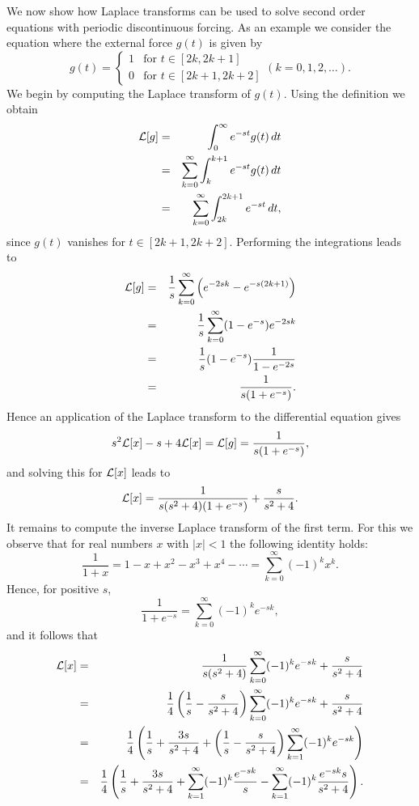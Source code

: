\documentclass{ximera}
\begin{document}
We now show how Laplace transforms can be used to solve second order
equations with periodic discontinuous forcing.  As an example we consider
the equation  where the external force $g(t)$ is
given by
\begin{equation}
g(t) =  
\left\{\begin{array}{cl} 1 & \mbox{for $t \in [2k,2k+1]$} \\ 
		0 & \mbox{for $t \in [2k+1,2k+2]$} \end{array} \right.
(k=0,1,2,\ldots).
\end{equation}
We begin by computing the Laplace transform of $g(t)$. Using the 
definition we obtain
\begin{eqnarray*}
{\cal L}[g] & = & \int_0^\infty e^{-st} g(t)\, dt\\
&=& \sum_{k=0}^\infty \int_k^{k+1} e^{-st} g(t)\, dt\\
&=& \sum_{k=0}^\infty \int_{2k}^{2k+1} e^{-st}\, dt,
\end{eqnarray*}
since $g(t)$ vanishes for $t \in [2k+1,2k+2]$. Performing the
integrations leads to
\begin{eqnarray*}
{\cal L}[g] & = & \frac{1}{s}\sum_{k=0}^\infty \left(e^{-2sk}-e^{-s(2k+1)}\right)\\
&=& \frac{1}{s}\sum_{k=0}^\infty (1-e^{-s})e^{-2sk}\\
&=& \frac{1}{s} (1-e^{-s}) \frac{1}{1-e^{-2s}}\\
&=& \frac{1}{s(1+e^{-s})}.
\end{eqnarray*}
Hence an application of the Laplace transform to the differential equation 
 gives
\[
s^2{\cal L}[x]-s + 4{\cal L}[x] = {\cal L}[g] = \frac{1}{s(1+e^{-s})},
\]
and solving this for ${\cal L}[x]$ leads to
\[
{\cal L}[x] = \frac{1}{s(s^2 +4)(1+e^{-s})} + \frac{s}{s^2 +4}.
\]
It remains to compute the inverse Laplace transform 
of the first term.  For this
we observe that for real numbers $x$ with $|x|<1$ the following identity holds:
\[
\frac{1}{1+x} = 1-x+x^2-x^3+x^4-\cdots = \sum_{k=0}^\infty (-1)^k x^k.
\]
Hence, for positive $s$,
\[
\frac{1}{1+e^{-s}} = \sum_{k=0}^\infty (-1)^k e^{-sk},
\]
and it follows that
\begin{eqnarray*}
{\cal L}[x] &=&\frac{1}{s(s^2 +4)}\sum_{k=0}^\infty (-1)^k e^{-sk} + \frac{s}{s^2 +4}\\
&=& \frac{1}{4}\left(\frac{1}{s}-\frac{s}{s^2+4}\right)
    \sum_{k=0}^\infty (-1)^k e^{-sk} + \frac{s}{s^2 +4}\\
&=& \frac{1}{4}\left(\frac{1}{s}+\frac{3s}{s^2+4}+
   \left(\frac{1}{s}-\frac{s}{s^2+4}\right) \sum_{k=1}^\infty (-1)^k e^{-sk}\right)\\
&=& \frac{1}{4}\left(\frac{1}{s}+\frac{3s}{s^2+4}+
   \sum_{k=1}^\infty (-1)^k \frac{e^{-sk}}{s}-
   \sum_{k=1}^\infty (-1)^k \frac{e^{-sk}s}{s^2+4}\right).
\end{eqnarray*} 
\end{document}
